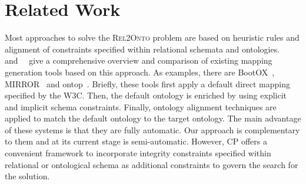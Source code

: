 \documentclass[letterpaper]{article} %
\newcommand{\authornote}[3]{
  {\fbox{\sc 
  #1}:$\blacktriangleright$\textcolor{#2}{\small{#3}}$\blacktriangleleft$}%
}
\newcommand{\npr}[1]{\authornote{NPR}{orange}{#1}}
\newcommand{\relonto}{\textsc{Rel2Onto}}
\newcommand{\ignore}[1]{}
\newcommand{\forijcai}[1]{}
\newcommand{\citeasnoun}[1]{\citeauthor{#1}~\shortcite{#1}}
\begin{document}

\section{Related Work \label{SEC:pw}}
\ignore{
Relational data sources are still one of the most popular ways to store enterprise or Web data. However, the issue with relational schema is the lack of a well-defined semantic description.
A common ontology provides a way of representing the meaning of a relational 
schema and can facilitate the integration of heterogeneous data sources within 
a domain.
Indicating semantic correspondences manually might be appropriate if only few data sources need to be integrated; however, it becomes tedious with the growing number of heterogeneous schemata.
Hence, automatic or semi-automatic approaches for relational-to-ontology schema mapping are being actively developed.}


Most approaches to solve the \relonto{} problem are based on 
heuristic rules and alignment of constraints specified within relational 
schemata and ontologies.
\citeasnoun{Pinkel:rodi} and~\citeasnoun{Spanos:semweb} give
a comprehensive overview and comparison of existing mapping generation 
tools based on this approach.
As examples, there are BootOX~\cite{Jimenez:Bootox}, MIRROR~\cite{Luciano:Mirror} and  ontop~\cite{Fagin:Clio}.
Briefly, these tools first apply a default direct mapping specified by the W3C.
Then, the default ontology is enriched by using explicit and implicit schema constraints.
Finally, ontology alignment techniques are applied to match the default ontology to the target ontology.
The main advantage of these systems is that they are fully automatic\forijcai{ the ability to run in a fully automatic setting}.
Our approach is complementary to them and at its current stage is semi-automatic.
However, CP offers a convenient framework to incorporate integrity constraints specified \forijcai{either} within relational or ontological schema as additional constraints to govern the search for the solution.
\forijcai{This opens an interesting direction for further research.}
\end{document}
